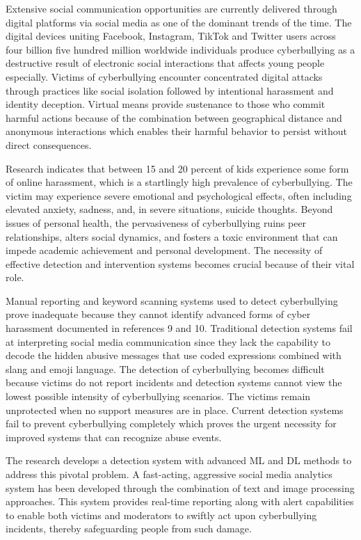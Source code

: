 Extensive social communication opportunities are currently delivered through digital platforms via social media as one of the dominant trends of the time. The digital devices uniting Facebook, Instagram, TikTok and Twitter users across four billion five hundred million worldwide individuals produce cyberbullying as a destructive result of electronic social interactions that affects young people especially.\cite{bib7}\cite{bib8} Victims of cyberbullying encounter concentrated digital attacks through practices like social isolation followed by intentional harassment and identity deception.  Virtual means provide sustenance to those who commit harmful actions because of the combination between geographical distance and anonymous interactions which enables their harmful behavior to persist without direct consequences.

Research indicates that between 15 and 20 percent of kids experience some form of online harassment, which is a startlingly high prevalence of cyberbullying. \cite{bib7}  The victim may experience severe emotional and psychological effects, often including elevated anxiety, sadness, and, in severe situations, suicide thoughts. \cite{bib21}  Beyond issues of personal health, the pervasiveness of cyberbullying ruins peer relationships\cite{bib1}, alters social dynamics, and fosters a toxic environment that can impede academic achievement and personal development.  The necessity of effective detection and intervention systems becomes crucial because of their vital role.

Manual reporting and keyword scanning systems used to detect cyberbullying prove inadequate because they cannot identify advanced forms of cyber harassment documented in references 9 and 10. Traditional detection systems fail at interpreting social media communication since they lack the capability to decode the hidden abusive messages that use coded expressions combined with slang and emoji language\cite{bib8}. The detection of cyberbullying becomes difficult because victims do not report incidents and detection systems cannot view the lowest possible intensity of cyberbullying scenarios. The victims remain unprotected when no support measures are in place. Current detection systems fail to prevent cyberbullying completely which proves the urgent necessity for improved systems that can recognize abuse events. 

The research develops a detection system with advanced ML and DL methods to address this pivotal problem. A fast-acting, aggressive social media analytics system has been developed through the combination of text and image processing approaches. This system provides real-time reporting along with alert capabilities to enable both victims and moderators to swiftly act upon cyberbullying incidents, thereby safeguarding people from such damage.

